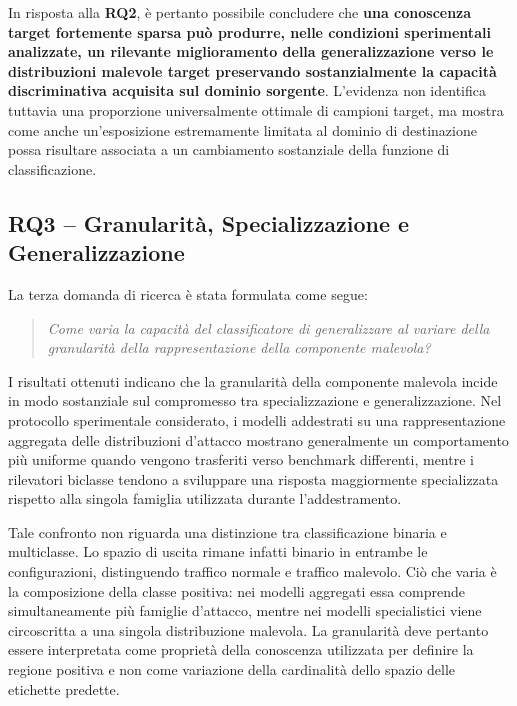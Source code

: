 In risposta alla \textbf{RQ2}, è pertanto possibile concludere che \textbf{una conoscenza target fortemente sparsa può produrre, nelle condizioni sperimentali analizzate, un rilevante miglioramento della generalizzazione verso le distribuzioni malevole target preservando sostanzialmente la capacità discriminativa acquisita sul dominio sorgente}.
L'evidenza non identifica tuttavia una proporzione universalmente ottimale di campioni target, ma mostra come anche un'esposizione estremamente limitata al dominio di destinazione possa risultare associata a un cambiamento sostanziale della funzione di classificazione.



\subsection{RQ3 -- Granularità, Specializzazione e Generalizzazione}
\label{subsec:conclusioni_rq3}

La terza domanda di ricerca è stata formulata come segue:

\begin{quote}
\textit{Come varia la capacità del classificatore di generalizzare al variare della granularità della rappresentazione della componente malevola?}
\end{quote}

I risultati ottenuti indicano che la granularità della componente malevola incide in modo sostanziale sul compromesso tra specializzazione e generalizzazione.
Nel protocollo sperimentale considerato, i modelli addestrati su una rappresentazione aggregata delle distribuzioni d'attacco mostrano generalmente un comportamento più uniforme quando vengono trasferiti verso benchmark differenti, mentre i rilevatori biclasse tendono a sviluppare una risposta maggiormente specializzata rispetto alla singola famiglia utilizzata durante l'addestramento.

Tale confronto non riguarda una distinzione tra classificazione binaria e multiclasse.
Lo spazio di uscita rimane infatti binario in entrambe le configurazioni, distinguendo traffico normale e traffico malevolo.
Ciò che varia è la composizione della classe positiva: nei modelli aggregati essa comprende simultaneamente più famiglie d'attacco, mentre nei modelli specialistici viene circoscritta a una singola distribuzione malevola.
La granularità deve pertanto essere interpretata come proprietà della conoscenza utilizzata per definire la regione positiva e non come variazione della cardinalità dello spazio delle etichette predette.

